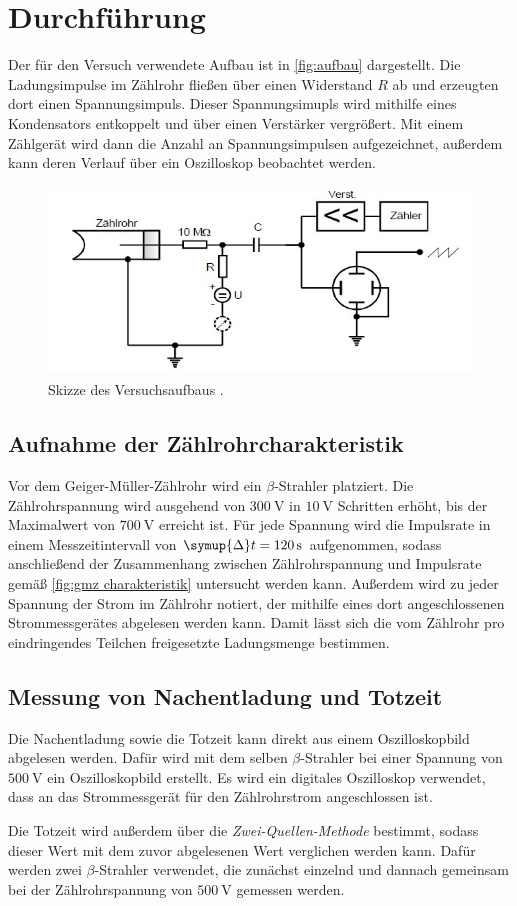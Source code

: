 \section{Durchführung}
\label{sec:Durchführung}
Der für den Versuch verwendete Aufbau ist in \autoref{fig:aufbau} dargestellt.
Die Ladungsimpulse im Zählrohr fließen über einen Widerstand $R$ ab und erzeugten
dort einen Spannungsimpuls. Dieser Spannungsimupls wird mithilfe eines
Kondensators entkoppelt und über einen Verstärker vergrößert.
Mit einem Zählgerät wird dann die Anzahl an Spannungsimpulsen aufgezeichnet, außerdem
kann deren Verlauf über ein Oszilloskop beobachtet werden.

\begin{figure}[H]
    \centering
    \includegraphics[height=5cm]{content/pics/aufbau.jpg}
    \caption{Skizze des Versuchsaufbaus \cite{v703}.}
    \label{fig:aufbau}
\end{figure}

\subsection{Aufnahme der Zählrohrcharakteristik}
Vor dem Geiger-Müller-Zählrohr wird ein $\beta$-Strahler platziert.
Die Zählrohrspannung wird ausgehend von $\qty{300}{\volt}$ in $\qty{10}{\volt}$ Schritten erhöht,
bis der Maximalwert von $\qty{700}{\volt}$ erreicht ist.
Für jede Spannung wird die Impulsrate in einem Messzeitintervall von $\symup{\Delta}t=\qty{120}{\second}$
aufgenommen, sodass anschließend der Zusammenhang zwischen Zählrohrspannung und Impulsrate
gemäß \autoref{fig:gmz charakteristik} untersucht werden kann.
Außerdem wird zu jeder Spannung der Strom im Zählrohr notiert, der mithilfe eines dort angeschlossenen
Strommessgerätes abgelesen werden kann. Damit lässt sich die vom Zählrohr pro eindringendes Teilchen
freigesetzte Ladungsmenge bestimmen.

\subsection{Messung von Nachentladung und Totzeit}
Die Nachentladung sowie die Totzeit kann direkt aus einem Oszilloskopbild abgelesen werden.
Dafür wird mit dem selben $\beta$-Strahler bei einer Spannung von $\qty{500}{\volt}$
ein Oszilloskopbild erstellt. Es wird ein digitales Oszilloskop verwendet, dass an das
Strommessgerät für den Zählrohrstrom angeschlossen ist.

Die Totzeit wird außerdem über die \textit{Zwei-Quellen-Methode} bestimmt, sodass dieser Wert mit dem
zuvor abgelesenen Wert verglichen werden kann. Dafür werden zwei $\beta$-Strahler
verwendet, die zunächst einzelnd und dannach gemeinsam bei der Zählrohrspannung von $\qty{500}{\volt}$
gemessen werden.